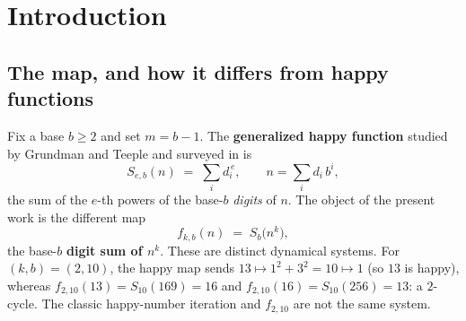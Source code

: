 \documentclass[11pt]{article}
\theoremstyle{definition}
\theoremstyle{remark}
\begin{document}
\begin{abstract}
Results (I) and (II) are elementary consequences of the digit-sum congruence (``casting out nines'') and of residue equidistribution. Novelty is claimed for the organization of these consequences and for isolating the remaining problem: how the mass $p_i$ splits among several physical attractors that share a signature. That partition is not elementary. I resolve it empirically and mechanistically. No individual basin density appears to exist; along fixed digit-length the masses oscillate quasi-periodically, in antiphase between competing attractors, while always summing to $p_i$. A parameter-free model, the Gaussian law of $S_b(n^k)$ (local limit theorem) on the image lattice $v \equiv r^k \pmod{b-1}$, convolved with the exact integer-to-attractor labelling, reproduces the oscillation to within Monte-Carlo noise (mean per-band bridge error $|\delta_j-F_j| \approx 0.0017$ on the $(3,10)$ pilot over $D=4\ldots 90$; \texttt{scripts/bridge\_check.py}). The oscillation is an instance of the classical log-periodic fluctuation of digital functions (Delange; Drmota--Grabner).

All claims are verified computationally: an exhaustive sweep of $19{,}500$ parameter pairs $(k,b)$ with $k \le 500$, $b \le 40$, with zero lower-bound violations and with the exact integer form of the aggregate law holding without exception, together with an independent re-implementation reported in Appendix~A.

\smallskip
\noindent\emph{Erratum.} This version corrects five errors in the July 2026 draft: a false statement about the modular cycle count, a misclassification of which signatures oscillate, an overstated claim of sharpness for the error bound, a confounded statistic, and a wrong congruence lattice in the Gaussian split model. Each is documented in Appendix~B, with the reasoning that produced it, since the failure modes are instructive.
\end{abstract}

\section{Introduction}

\subsection{The map, and how it differs from happy functions}

Fix a base $b \ge 2$ and set $m = b-1$. The \textbf{generalized happy function} studied by Grundman and Teeple \cite{GT01,GT07} and surveyed in \cite{survey} is
\[
S_{e,b}(n) \;=\; \sum_i d_i^{\,e}, \qquad n = \sum_i d_i\, b^i,
\]
the sum of the $e$-th powers of the base-$b$ \emph{digits} of $n$. The object of the present work is the different map
\[
f_{k,b}(n) \;=\; S_b\big(n^k\big),
\]
the base-$b$ \textbf{digit sum of $n^k$}. These are distinct dynamical systems. For $(k,b) = (2,10)$, the happy map sends $13 \mapsto 1^2+3^2 = 10 \mapsto 1$ (so $13$ is happy), whereas $f_{2,10}(13) = S_{10}(169) = 16$ and $f_{2,10}(16) = S_{10}(256) = 13$: a $2$-cycle. The classic happy-number iteration and $f_{2,10}$ are not the same system.
\end{document}
